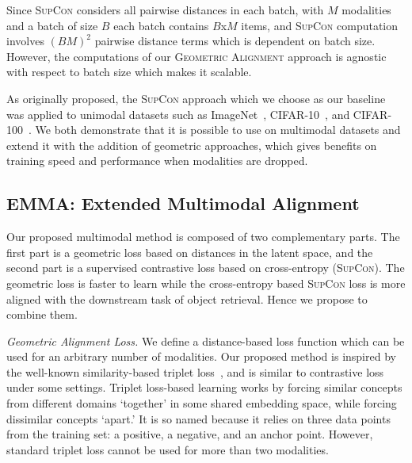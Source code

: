 \documentclass[sigconf,natbib=true,anonymous=true]{acmart}
\newcommand{\geom}{\textsc{Geometric Alignment}}
\newcommand{\supcon}{\textsc{SupCon}}
\begin{document}
Since \supcon{} considers all pairwise distances in each batch, with $M$ modalities and a batch of size $B$ each batch contains $B$x$M$ items, and \supcon{} computation involves $(BM)^2$ pairwise distance terms which is dependent on batch size. However, the computations of our \geom{} approach is agnostic with respect to batch size which makes it scalable.

As originally proposed, the \supcon{} approach which we choose as our baseline was applied to unimodal datasets such as ImageNet~\cite{imagenet2009}, CIFAR-10~\cite{krizhevsky2009learning}, and CIFAR-100~\cite{krizhevsky2009learning}. We both demonstrate that it is possible to use on multimodal datasets and extend it with the addition of geometric approaches, which gives benefits on training speed and performance when modalities are dropped.

\subsection{EMMA: Extended Multimodal Alignment}
\label{sec:emma}
Our proposed multimodal method is composed of two complementary parts. The first part is a geometric loss based on distances in the latent space, and the second part is a supervised contrastive loss based on cross-entropy (\supcon{}). The geometric loss is faster to learn while the cross-entropy based \supcon{} loss is more aligned with the downstream task of object retrieval. Hence we propose to combine them. 


\textit{Geometric Alignment Loss.}
We define a distance-based loss function which can be used for an arbitrary number of modalities. Our proposed method is inspired by the well-known similarity-based triplet loss~\citep{Carvalho-cooking-triplet,triplet_loss_2021_CVPR}, and is similar to contrastive loss~\citep{chen2020simple,NEURIPS2020_supervised_contrastive} under some settings.
Triplet loss-based learning works by forcing similar concepts from different domains `together' in some shared embedding space, while forcing dissimilar concepts `apart.' It is so named because it relies on three data points from the training set: a positive, a negative, and an anchor point. 
However, standard triplet loss cannot be used for more than two modalities.
\end{document}
